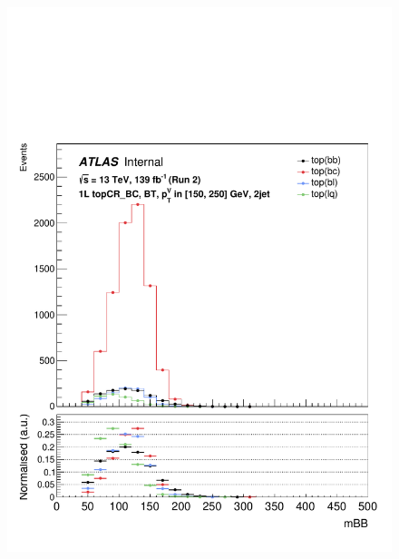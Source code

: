 \begin{figure}[h!]
\includegraphics[scale=0.253]{Images/VH/top/OneLepton_top_1bttag2jet_topCR_BC_150_250ptv_mBB.pdf}\\

\end{figure}

